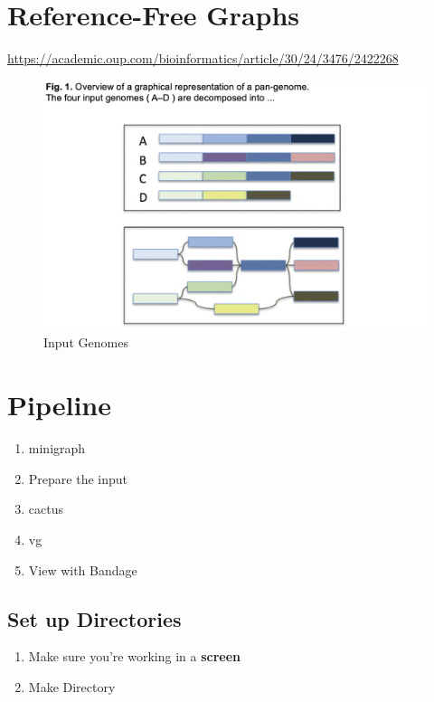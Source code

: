 \documentclass[
]{book}
\providecommand{\tightlist}{%
  \setlength{\itemsep}{0pt}\setlength{\parskip}{0pt}}
\begin{document}
\hypertarget{reference-free-graphs}{%
\section{Reference-Free Graphs}\label{reference-free-graphs}}

\url{https://academic.oup.com/bioinformatics/article/30/24/3476/2422268}

\begin{figure}
\centering
\includegraphics[width=1\textwidth,height=\textheight]{./Figures/InputGenomes.png}
\caption{Input Genomes}
\end{figure}

\hypertarget{pipeline-2}{%
\section{Pipeline}\label{pipeline-2}}

\begin{enumerate}
\def\labelenumi{\arabic{enumi}.}
\tightlist
\item
  minigraph
\item
  Prepare the input
\item
  cactus
\item
  vg
\item
  View with Bandage
\end{enumerate}

\hypertarget{set-up-directories-2}{%
\subsection{Set up Directories}\label{set-up-directories-2}}

\begin{enumerate}
\def\labelenumi{\arabic{enumi}.}
\item
  Make sure you're working in a \textbf{screen}
\item
  Make Directory
\end{enumerate}
\end{document}
